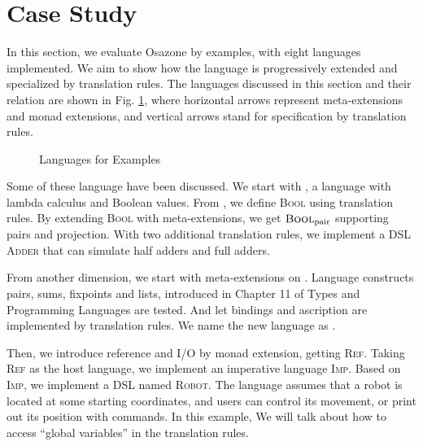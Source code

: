 \section{Case Study}\label{sec:eval}

In this section, we evaluate Osazone by examples, with eight languages implemented.
We aim to show how the language is progressively extended and specialized by translation rules.
The languages discussed in this section and their relation are shown in Fig. \ref{fig:langs},
 where horizontal arrows represent meta-extensions and monad extensions,
 and vertical arrows stand for specification by translation rules.

\begin{figure}
  
  \caption{Languages for Examples}
  \label{fig:langs}
\end{figure}

Some of these language have been discussed.
We start with \STLC, a language with lambda calculus and Boolean values.
From \STLC, we define \textsc{Bool} using translation rules.
By extending \textsc{Bool} with meta-extensions, we get $\textsc{Bool}_{\text{pair}}$ supporting pairs and projection.
With two additional translation rules, we implement a DSL \textsc{Adder} that can simulate half adders and full adders.

From another dimension, we start with meta-extensions on \STLC.
Language constructs pairs, sums, fixpoints and lists,
 introduced in Chapter 11 of Types and Programming Languages\cite{tapl} are tested.
And let bindings and ascription are implemented by translation rules.
We name the new language as \STLCex.

Then, we introduce reference and I/O by monad extension, getting \textsc{Ref}.
Taking \textsc{Ref} as the host language,
 we implement an imperative language \textsc{Imp}.
%
Based on \textsc{Imp}, we implement a DSL named \textsc{Robot}.
The language assumes that a robot is located at some starting coordinates,
 and users can control its movement, or print out its position with commands.
In this example, We will talk about how to access ``global variables'' in the translation rules.

